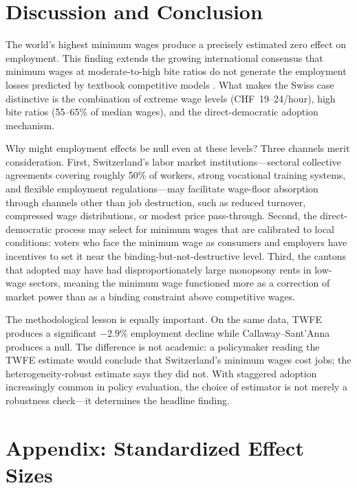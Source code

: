 \documentclass[12pt]{article}
\begin{document}


\section{Discussion and Conclusion}
\label{sec:conclusion}

The world's highest minimum wages produce a precisely estimated zero effect on employment. This finding extends the growing international consensus that minimum wages at moderate-to-high bite ratios do not generate the employment losses predicted by textbook competitive models \citep{manning2021,cengiz2019}. What makes the Swiss case distinctive is the combination of extreme wage levels (CHF~19--24/hour), high bite ratios (55--65\% of median wages), and the direct-democratic adoption mechanism.

Why might employment effects be null even at these levels? Three channels merit consideration. First, Switzerland's labor market institutions---sectoral collective agreements covering roughly 50\% of workers, strong vocational training systems, and flexible employment regulations---may facilitate wage-floor absorption through channels other than job destruction, such as reduced turnover, compressed wage distributions, or modest price pass-through. Second, the direct-democratic process may select for minimum wages that are calibrated to local conditions: voters who face the minimum wage as consumers and employers have incentives to set it near the binding-but-not-destructive level. Third, the cantons that adopted may have had disproportionately large monopsony rents in low-wage sectors, meaning the minimum wage functioned more as a correction of market power than as a binding constraint above competitive wages.

The methodological lesson is equally important. On the same data, TWFE produces a significant $-2.9\%$ employment decline while Callaway--Sant'Anna produces a null. The difference is not academic: a policymaker reading the TWFE estimate would conclude that Switzerland's minimum wages cost jobs; the heterogeneity-robust estimate says they did not. With staggered adoption increasingly common in policy evaluation, the choice of estimator is not merely a robustness check---it determines the headline finding.

\label{apep_main_text_end}



\clearpage
\appendix
\section*{Appendix: Standardized Effect Sizes}
\end{document}
